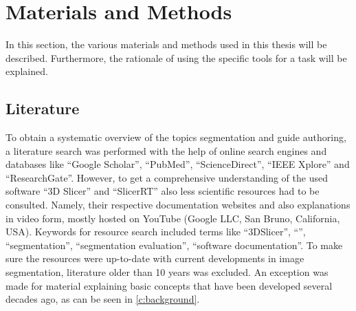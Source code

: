
\chapter{Materials and Methods}\label{c:materialsNmethods}

In this section, the various materials and methods used in this thesis will be described.
Furthermore, the rationale of using the specific tools for a task will be explained.

\section{Literature}\label{s:literature}
To obtain a systematic overview of the topics \mct\space segmentation and guide authoring, a literature search was performed with the help of online search engines and databases like ``Google Scholar'', ``PubMed'', ``ScienceDirect'', ``IEEE Xplore'' and ``ResearchGate''.
However, to get a comprehensive understanding of the used software ``3D Slicer'' and ``SlicerRT'' also less scientific resources had to be consulted.
Namely, their respective documentation websites and also explanations in video form, mostly hosted on YouTube (Google LLC, San Bruno, California, USA).
Keywords for resource search included terms like ``3DSlicer'', ``\mct'', ``segmentation'', ``segmentation evaluation'', ``software documentation''.
To make sure the resources were up-to-date with current developments in image segmentation, literature older than 10 years was excluded.
An exception was made for material explaining basic concepts that have been developed several decades ago, as can be seen in \cref{c:background}.


